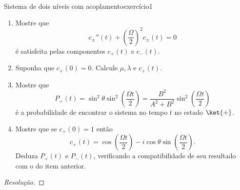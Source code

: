 \begin{exercício}{Sistema de dois níveis com acoplamento}{exercício1}
\begin{enumerate}[label=(\alph*)]
            onde \(\hbar \Omega\) é a diferença entre os dois níveis de energia.
        \item Mostre que
            \begin{equation*}
                c_\pm''(t) + \left(\frac{\Omega}{2}\right)^2 c_{\pm}(t) = 0
            \end{equation*}
            é satisfeita pelas componentes \(c_+(t)\) e \(c_-(t)\).
        \item Suponha que \(c_+(0) = 0\). Calcule \(\mu, \lambda\) e \(c_+(t)\).
        \item Mostre que
            \begin{equation*}
                P_+(t) = \sin^2\theta \sin^2\left(\frac{\Omega t}{2}\right) = \frac{B^2}{A^2 + B^2}\sin^2\left(\frac{\Omega t}{2}\right)
            \end{equation*}
            é a probabilidade de encontrar o sistema no tempo \(t\) no estado \(\ket{+}\).
        \item Mostre que se \(c_+(0) = 1\) então
            \begin{equation*}
                c_+(t) = \cos\left(\frac{\Omega t}{2}\right) - i \cos\theta \sin\left(\frac{\Omega t}{2}\right).
            \end{equation*}
            Deduza \(P_+(t)\) e \(P_-(t)\), verificando a compatibilidade de seu resultado com o do item anterior.
    \end{enumerate}
\end{exercício}
\begin{proof}[Resolução]

\end{proof}
